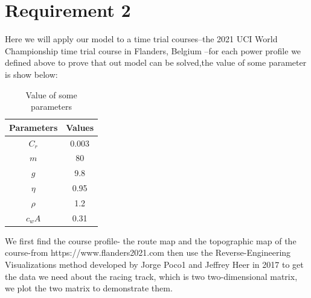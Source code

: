 \documentclass[12pt]{article}
\begin{document}
\section{Requirement 2}
Here we will apply our model to a time trial courses--the 2021 UCI World Championship time trial course in Flanders, Belgium --for each power profile we defined
above to prove that out model can be solved,the value of some parameter is show below:
\begin{table}[H]
    \centering
    \begin{tabular}{cc}
        \toprule
        \bf Parameters & \bf Values \\
        \midrule
        $C_r$          & 0.003      \\
        $m$            & 80         \\
        $g$            & 9.8        \\
        $\eta $        & 0.95       \\
        $\rho  $       & 1.2        \\
        $c_wA$         & 0.31       \\
        \bottomrule
    \end{tabular}
    \caption{Value of some parameters}
\end{table}
We first find the course profile- the route map and the topographic map of the course-from https://www.flanders2021.com
then use the Reverse-Engineering Visualizations method developed by Jorge Poco1 and Jeffrey Heer in 2017\cite{poco2017reverse} to get the data we need about the racing track,
which is two two-dimensional matrix, we plot the two matrix to demonstrate them.
\end{document}
